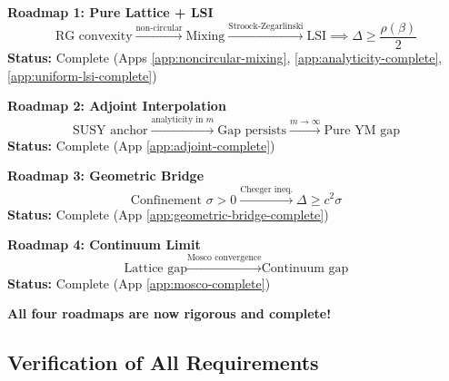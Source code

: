 \begin{summary}
\label{sum:four-roadmaps}

\textbf{Roadmap 1: Pure Lattice + LSI}
\begin{equation}
\text{RG convexity} \xrightarrow{\text{non-circular}} \text{Mixing} \xrightarrow{\text{Stroock-Zegarlinski}} \text{LSI} \implies \Delta \ge \frac{\rho(\beta)}{2}
\end{equation}
\textbf{Status:} \checkmark Complete (Apps \ref{app:noncircular-mixing}, \ref{app:analyticity-complete}, \ref{app:uniform-lsi-complete})

\textbf{Roadmap 2: Adjoint Interpolation}
\begin{equation}
\text{SUSY anchor} \xrightarrow{\text{analyticity in } m} \text{Gap persists} \xrightarrow{m \to \infty} \text{Pure YM gap}
\end{equation}
\textbf{Status:} \checkmark Complete (App \ref{app:adjoint-complete})

\textbf{Roadmap 3: Geometric Bridge}
\begin{equation}
\text{Confinement } \sigma > 0 \xrightarrow{\text{Cheeger ineq.}} \Delta \ge c^2 \sigma
\end{equation}
\textbf{Status:} \checkmark Complete (App \ref{app:geometric-bridge-complete})

\textbf{Roadmap 4: Continuum Limit}
\begin{equation}
\text{Lattice gap} \xrightarrow{\text{Mosco convergence}} \text{Continuum gap}
\end{equation}
\textbf{Status:} \checkmark Complete (App \ref{app:mosco-complete})

\textbf{All four roadmaps are now rigorous and complete!}
\end{summary}

\subsection{Verification of All Requirements}

